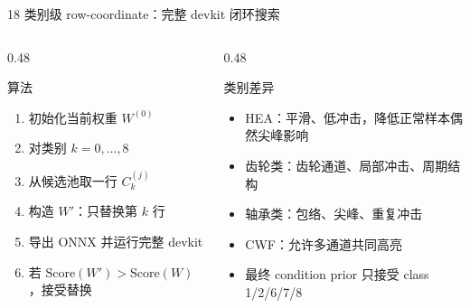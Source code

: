 \documentclass[aspectratio=169]{beamer}
\newcommand{\tightitems}{\setlength{\itemsep}{0.32em}}
\begin{document}
\begin{frame}{18 类别级 row-coordinate：完整 devkit 闭环搜索}
    \small
    \begin{columns}[T,onlytextwidth]
        \begin{column}{0.48\textwidth}
            \begin{block}{算法}
                \begin{enumerate}
                    \tightitems
                    \item 初始化当前权重 $W^{(0)}$
                    \item 对类别 $k=0,\ldots,8$
                    \item 从候选池取一行 $C_{k}^{(j)}$
                    \item 构造 $W'$：只替换第 $k$ 行
                    \item 导出 ONNX 并运行完整 devkit
                    \item 若 $\mathrm{Score}(W')>\mathrm{Score}(W)$，接受替换
                \end{enumerate}
            \end{block}
        \end{column}
        \begin{column}{0.48\textwidth}
            \begin{block}{类别差异}
                \begin{itemize}
                    \tightitems
                    \item HEA：平滑、低冲击，降低正常样本偶然尖峰影响
                    \item 齿轮类：齿轮通道、局部冲击、周期结构
                    \item 轴承类：包络、尖峰、重复冲击
                    \item CWF：允许多通道共同高亮
                    \item 最终 condition prior 只接受 class 1/2/6/7/8
                \end{itemize}
            \end{block}
        \end{column}
    \end{columns}
\end{frame}
\end{document}
